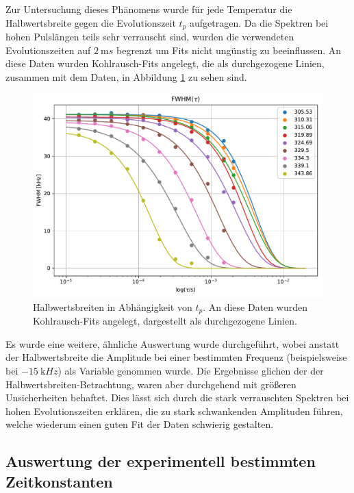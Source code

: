 Zur Untersuchung dieses Phänomens wurde für jede Temperatur die Halbwertsbreite gegen die Evolutionszeit $t_p$ aufgetragen. Da die Spektren bei hohen Pulslängen teils sehr verrauscht sind, wurden die verwendeten Evolutionszeiten auf $\SI{2}{\milli s}$ begrenzt um Fits nicht ungünstig zu beeinflussen. An diese Daten wurden Kohlrausch-Fits angelegt, die als durchgezogene Linien, zusammen mit dem Daten, in Abbildung \ref{fig:res:spekdyn_fits} zu sehen sind.
\begin{figure}
	\begin{center}
		\includegraphics[width=.9\textwidth]{graphics/plots/SPEKDYN/spekdyn_fits.pdf}
	\end{center}
	\caption{Halbwertsbreiten in Abhängigkeit von $t_p$. An diese Daten wurden Kohlrausch-Fits angelegt, dargestellt als durchgezogene Linien.} \label{fig:res:spekdyn_fits}
\end{figure}

Es wurde eine weitere, ähnliche Auswertung wurde durchgeführt, wobei anstatt der Halbwertsbreite die Amplitude bei einer bestimmten Frequenz (beispielsweise bei $\SI{-15}{\kilo Hz}$) als Variable genommen wurde. Die Ergebnisse glichen der der Halbwertsbreiten-Betrachtung, waren aber durchgehend mit größeren Unsicherheiten behaftet. Dies lässt sich durch die stark verrauschten Spektren bei hohen Evolutionszeiten erklären, die zu stark schwankenden Amplituden führen, welche wiederum einen guten Fit der Daten schwierig gestalten.



\subsection{Auswertung der experimentell bestimmten Zeitkonstanten} \label{section:res:dynausw}

